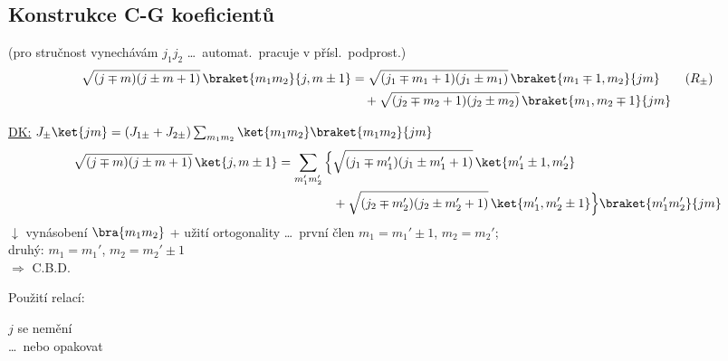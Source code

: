 \subsection*{Konstrukce C-G koeficientů}

\begin{veta}
{\color{defbarva}(pro stručnost vynechávám $j_1j_2$ \dots\ automat.\ pracuje v přísl.\ podprost.)}
\begin{align*}
  \sqrt{(j\mp m)(j\pm m+1)}\,\braket{m_1m_2}{j,m\pm1}
  &= \sqrt{(j_1\mp m_1+1)(j_1\pm m_1)}\,\braket{m_1\mp1,m_2}{jm} \tag{$R_\pm$} \\
  &\quad + \sqrt{(j_2\mp m_2+1)(j_2\pm m_2)}\,\braket{m_1,m_2\mp1}{jm}
\end{align*}
\end{veta}

\underline{DK:} \quad $J_\pm\ket{jm} = (J_{1\pm} + J_{2\pm})\sum_{m_1m_2}\ket{m_1m_2}\braket{m_1m_2}{jm}$
\begin{align*}
  \sqrt{(j\mp m)(j\pm m+1)}\,\ket{j,m\pm1} = \sum_{m_1'm_2'}\Big\{&\sqrt{(j_1\mp m_1')(j_1\pm m_1'+1)}\,\ket{m_1'\pm1,m_2'} \\
  &+ \sqrt{(j_2\mp m_2')(j_2\pm m_2'+1)}\,\ket{m_1',m_2'\pm1}\Big\}\braket{m_1'm_2'}{jm}
\end{align*}
$\downarrow$ vynásobení $\bra{m_1m_2}$ + užití ortogonality \dots\ první člen $m_1 = m_1'\pm1$, $m_2 = m_2'$; \\
\hspace*{9.2cm} druhý: $m_1 = m_1'$, $m_2 = m_2'\pm1$ \\
$\Rightarrow$ C.B.D.

\begin{minipage}{0.25\textwidth}
Použití relací:

\medskip
$j$ se nemění \\
\dots\ nebo opakovat
\end{minipage}
\begin{minipage}{0.74\textwidth}
\end{minipage}


